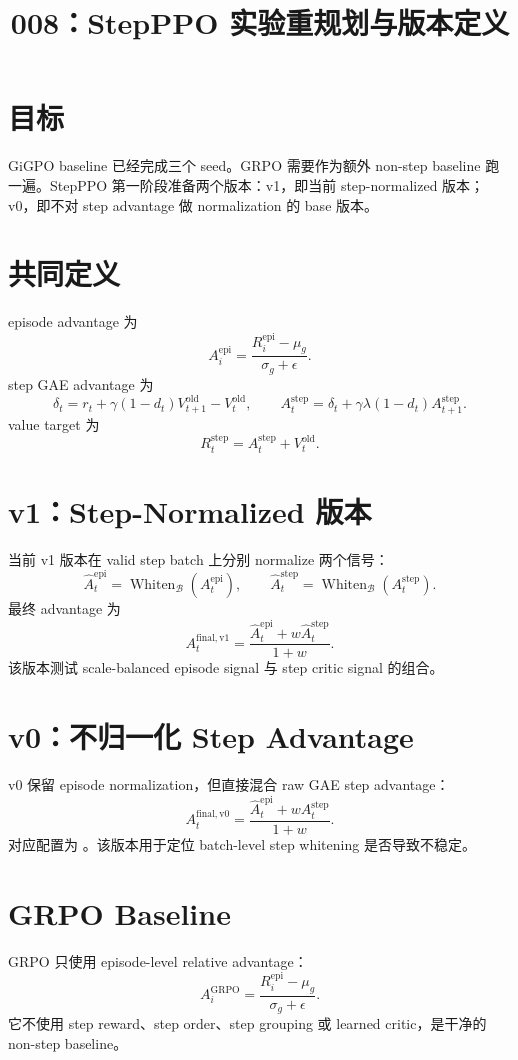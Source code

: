 \documentclass[10pt]{ctexart}
\title{008：StepPPO 实验重规划与版本定义}
\author{}
\date{}
\newcommand{\Whiten}{\operatorname{Whiten}}
\begin{document}
\maketitle
\vspace{-1.2em}

\section*{目标}
GiGPO baseline 已经完成三个 seed。GRPO 需要作为额外 non-step baseline 跑一遍。StepPPO 第一阶段准备两个版本：v1，即当前 step-normalized 版本；v0，即不对 step advantage 做 normalization 的 base 版本。

\section*{共同定义}
episode advantage 为
\[
A_i^{\mathrm{epi}}=\frac{R_i^{\mathrm{epi}}-\mu_g}{\sigma_g+\epsilon}.
\]
step GAE advantage 为
\[
\delta_t=r_t+\gamma(1-d_t)V^{\mathrm{old}}_{t+1}-V^{\mathrm{old}}_t,
\qquad
A_t^{\mathrm{step}}=\delta_t+\gamma\lambda(1-d_t)A_{t+1}^{\mathrm{step}}.
\]
value target 为
\[
R_t^{\mathrm{step}}=A_t^{\mathrm{step}}+V_t^{\mathrm{old}}.
\]

\section*{v1：Step-Normalized 版本}
当前 v1 版本在 valid step batch 上分别 normalize 两个信号：
\[
\widehat A_t^{\mathrm{epi}}=\Whiten_{\mathcal B}(A_t^{\mathrm{epi}}),
\qquad
\widehat A_t^{\mathrm{step}}=\Whiten_{\mathcal B}(A_t^{\mathrm{step}}).
\]
最终 advantage 为
\[
A_t^{\mathrm{final,v1}}
=\frac{\widehat A_t^{\mathrm{epi}}+w\widehat A_t^{\mathrm{step}}}{1+w}.
\]
该版本测试 scale-balanced episode signal 与 step critic signal 的组合。

\section*{v0：不归一化 Step Advantage}
v0 保留 episode normalization，但直接混合 raw GAE step advantage：
\[
A_t^{\mathrm{final,v0}}
=\frac{\widehat A_t^{\mathrm{epi}}+wA_t^{\mathrm{step}}}{1+w}.
\]
对应配置为 。该版本用于定位 batch-level step whitening 是否导致不稳定。

\section*{GRPO Baseline}
GRPO 只使用 episode-level relative advantage：
\[
A_i^{\mathrm{GRPO}}=\frac{R_i^{\mathrm{epi}}-\mu_g}{\sigma_g+\epsilon}.
\]
它不使用 step reward、step order、step grouping 或 learned critic，是干净的 non-step baseline。
\end{document}
